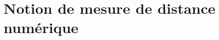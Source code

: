 \section{Notion de mesure de distance numérique}




















































 
